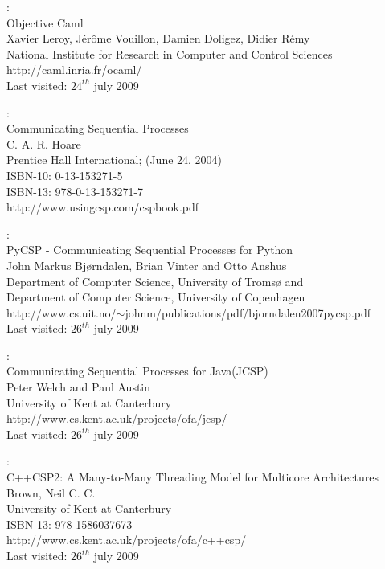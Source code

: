 \documentclass[a4paper,12pt]{article}
\begin{document}
\newpage
\begin{thebibliography}{99}

:\\
Objective Caml\\
Xavier Leroy, Jérôme Vouillon, Damien Doligez, Didier Rémy\\
National Institute for Research in Computer and Control Sciences\\
http://caml.inria.fr/ocaml/\\
Last visited: $24^{th}$ july 2009

:\\
Communicating Sequential Processes\\
C. A. R. Hoare\\
Prentice Hall International; (June 24, 2004)\\
ISBN-10: 0-13-153271-5\\
ISBN-13: 978-0-13-153271-7\\
http://www.usingcsp.com/cspbook.pdf

:\\
PyCSP - Communicating Sequential Processes for Python\\
John Markus Bjørndalen, Brian Vinter and Otto Anshus\\
Department of Computer Science, University of Tromsø and\\
Department of Computer Science, University of Copenhagen\\
http://www.cs.uit.no/$\sim$johnm/publications/pdf/bjorndalen2007pycsp.pdf\\
Last visited: $26^{th}$ july 2009

:\\
Communicating Sequential Processes for Java\texttrademark (JCSP)\\
Peter Welch and Paul Austin\\
University of Kent at Canterbury\\
http://www.cs.kent.ac.uk/projects/ofa/jcsp/\\
Last visited: $26^{th}$ july 2009

:\\
C++CSP2: A Many-to-Many Threading Model for Multicore Architectures\\
Brown,  Neil C. C.\\
University of Kent at Canterbury\\
ISBN-13: 978-1586037673\\
http://www.cs.kent.ac.uk/projects/ofa/c++csp/\\
Last visited: $26^{th}$ july 2009


\end{thebibliography}
\end{document}
